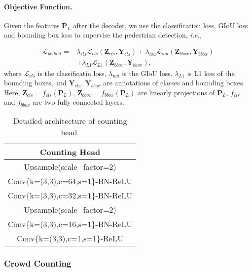 \documentclass[10pt,twocolumn,letterpaper]{article}
\begin{document}
\paragraph{Objective Function.} Given the features $\mathbf{P}_L$ after the decoder, we use the classification loss, GIoU loss and bounding box loss to supervise the pedestrian detection, \emph{i.e.,}

\begin{equation}
\begin{aligned}
\mathcal{L}_{peddet} = &\lambda_{cls}\mathcal{L}_{cls}(\mathbf{Z}_{cls}, \mathbf{Y}_{cls}) + \lambda_{iou}\mathcal{L}_{iou}(\mathbf{Z}_{bbox}, \mathbf{Y}_{bbox}) \\& + \lambda_{L1}\mathcal{L}_{L1}(\mathbf{Z}_{bbox}, \mathbf{Y}_{bbox}),
\end{aligned}
\end{equation}
where $\mathcal{L}_{cls}$ is the classificatin loss, $\lambda_{iou}$ is the GIoU loss, $\lambda_{L1}$ is L1 loss of the bounding boxes, and $\mathbf{Y}_{cls}$, $\mathbf{Y}_{bbox}$ are annotations of classes and bounding boxes. Here, $\mathbf{Z}_{cls}=f_{cls}(\mathbf{P}_L)$,  $\mathbf{Z}_{bbox}=f_{bbox}(\mathbf{P}_L)$ are linearly projections of $\mathbf{P}_L$, $f_{cls}$ and $f_{bbox}$ are two fully connected layers.




\begin{table}[t]
	\centering
	
	\begin{tabular}{c}
        \hline
        \textbf{Counting Head } \\
           \hline
         Upsample(scale\_factor=2)                     \\
         Conv\{k=(3,3),c=64,s=1\}-BN-ReLU                  \\
          Conv\{k=(3,3),c=32,s=1\}-BN-ReLU                   \\
        Upsample(scale\_factor=2)              \\
         Conv\{k=(3,3),c=16,s=1\}-BN-ReLU                \\
         Conv\{k=(3,3),c=1,s=1\}-ReLU \\
       \hline

	\end{tabular}
	\caption{Detailed architecture of counting head.}
	\label{Table:CP1}
\end{table}


\subsubsection{Crowd Counting}
\end{document}
